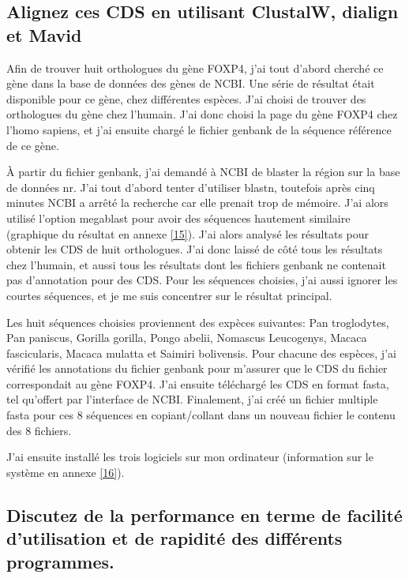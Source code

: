 \documentclass[10.8pt]{article} %
\begin{document}
\subsection[Alignement multiple]{Alignez ces CDS en utilisant ClustalW, dialign et Mavid}

Afin de trouver huit orthologues du gène FOXP4, j'ai tout d'abord cherché ce gène dans la base de données des
gènes de NCBI. Une série de résultat était disponible pour ce gène, chez différentes espèces. J'ai choisi de
trouver des orthologues du gène chez l'humain. J'ai donc choisi la page du gène FOXP4 chez l'homo sapiens,
et j'ai ensuite chargé le fichier genbank de la séquence référence de ce gène.

À partir du fichier genbank, j'ai demandé à NCBI de blaster la région sur la base de données nr. J'ai tout
d'abord tenter d'utiliser blastn, toutefois après cinq minutes NCBI a arrêté la recherche car elle prenait
trop de mémoire. J'ai alors utilisé l'option megablast pour avoir des séquences hautement similaire
(graphique du résultat en annexe \ref{15}). J'ai alors analysé les résultats pour obtenir les CDS de huit 
orthologues. J'ai donc laissé de côté tous les résultats chez l'humain, et aussi tous les résultats dont
les fichiers genbank ne contenait pas d'annotation pour des CDS. Pour les séquences choisies, j'ai aussi
ignorer les courtes séquences, et je me suis concentrer sur le résultat principal.

Les huit séquences choisies proviennent des expèces suivantes: Pan troglodytes, Pan paniscus, Gorilla gorilla,
Pongo abelii, Nomascus Leucogenys, Macaca fascicularis, Macaca mulatta et Saimiri bolivensis. Pour chacune
des espèces, j'ai vérifié les annotations du fichier genbank pour m'assurer que le CDS du fichier correspondait
au gène FOXP4. J'ai ensuite téléchargé les CDS en format fasta, tel qu'offert par l'interface de NCBI.
Finalement, j'ai créé un fichier multiple fasta pour ces 8 séquences en copiant/collant dans un nouveau fichier
le contenu des 8 fichiers.

J'ai ensuite installé les trois logiciels sur mon ordinateur (information sur le système en annexe \ref{16}).

\subsection[Facilité et rapidité des programmes]{Discutez de la performance en terme de facilité d'utilisation
et de rapidité des différents programmes.}
\end{document}
